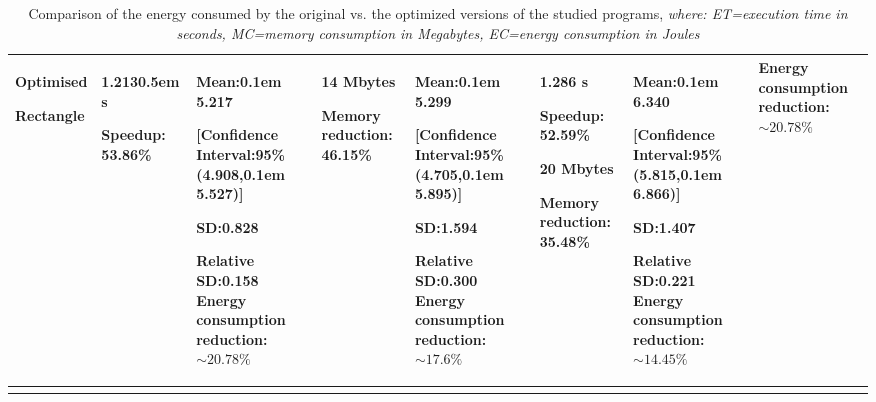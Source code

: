 {\begin{longtable}{|p{1.15cm}|p{1.3cm}|p{1.8cm}|p{1.5cm}|p{1.8cm}|p{1.8cm}|p{1.8cm}|p{2.5cm}|}
  
  \cline{1-7}
  Optimised\par Rectangle & 
  1.213\kern0.5em s\par \vspace{.5em} Speedup: 53.86\% &
  Mean:\kern0.1em 5.217\par \vspace{.5em} [Confidence Interval:95\% (4.908,\kern0.1em 5.527)]\par \vspace{.5em} SD:0.828\par \vspace{.5em} Relative SD:0.158\vspace{.5em} \textbf{Energy consumption reduction: $\sim 20.78\%$}\vspace{.5em} &
  14 Mbytes\par \vspace{1em} Memory reduction: 46.15\% &
  Mean:\kern0.1em 5.299\par \vspace{.5em} [Confidence Interval:95\% (4.705,\kern0.1em 5.895)]\par \vspace{.5em} SD:1.594\par \vspace{.5em} Relative SD:0.300\vspace{.5em} \textbf{Energy consumption reduction: $\sim 17.6\%$}\vspace{.5em} &
  1.286 s\par Speedup: 52.59\%\par \vspace{1em}
  20 Mbytes\par Memory reduction: 35.48\% &
  Mean:\kern0.1em 6.340\par \vspace{.5em} [Confidence Interval:95\% (5.815,\kern0.1em 6.866)]\par \vspace{.5em} SD:1.407\par \vspace{.5em} Relative SD:0.221\vspace{.5em} \textbf{Energy consumption reduction: $\sim 14.45\%$}\vspace{.5em} &
  \textbf{Energy consumption reduction: $\sim 20.78\%$}
  \\
  
  
 \hline
\caption{Comparison of the energy consumed by the original vs. the optimized versions of the studied programs, \textit{where: ET=execution time in seconds, MC=memory consumption in Megabytes, EC=energy consumption in Joules}}
\label{tab:Result}
\end{longtable}
}


